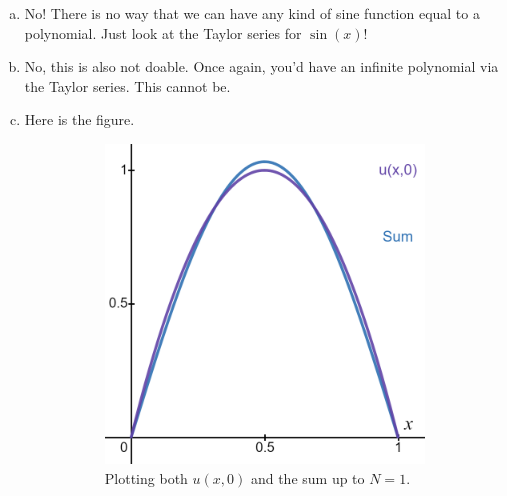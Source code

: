 \documentclass[12pt]{article} %
\begin{document}
\begin{solution}
\begin{enumerate}[(a)]
    \item No! There is no way that we can have any kind of sine function equal to a polynomial. Just look at the Taylor series for $\sin(x)$!
    \item No, this is also not doable. Once again, you'd have an infinite polynomial via the Taylor series. This cannot be.
    \item Here is the figure.
    \begin{figure}[H]
\centering
    \begin{subfigure}[b]{0.3\textwidth}
        \centering
        \includegraphics[width=\textwidth]{figures/sum_n1.png}
        \caption{Plotting both $u(x,0)$ and the sum up to $N=1$.}
    \end{subfigure}
    \hfill
    \begin{subfigure}[b]{0.3\textwidth}
        \centering

\end{subfigure}
\end{figure}
\end{enumerate}
\end{solution}
\end{document}
